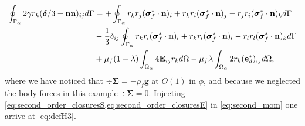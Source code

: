 \begin{align}
    \intS{2\gamma r_{k}(\bm\delta/3 - \textbf{nn})_{ij}}
    &= 
    +\intS{
        r_{k}r_{j} (\bm{\sigma}^*_f\cdot\textbf{n})_i 
        + r_{k}r_{i} (\bm{\sigma}^*_f\cdot\textbf{n})_j 
        - r_{j}r_{i} (\bm{\sigma}^*_f\cdot\textbf{n})_k 
    }\nonumber \\
    &-\frac{1}{3}\delta_{ij}\intS{
        r_{k}r_{l} (\bm{\sigma}^*_f\cdot\textbf{n})_l
        + r_{k}r_{l} (\bm{\sigma}^*_f\cdot\textbf{n})_l 
        - r_{l}r_{l} (\bm{\sigma}^*_f\cdot\textbf{n})_k 
    }\nonumber \\
    &+\mu_f (1-\lambda)\intO{ 4\textbf{E}_{ij} r_{k}  }
    - \mu_f\lambda \intO{2 r_{k}(\textbf{e}_d^*)_{ij}},
    \label{eq:second_mom}
\end{align}
where we have noticed that $\div\bm\Sigma = -  \rho_f \textbf{g}$ at $O(1)$ in $\phi$, and because we neglected the body forces in this example  $\div\bm\Sigma =0$. 
Injecting \ref{eq:second_order_closuresS,eq:second_order_closuresE} in \ref{eq:second_mom} one arrive at \ref{eq:defH3}.


